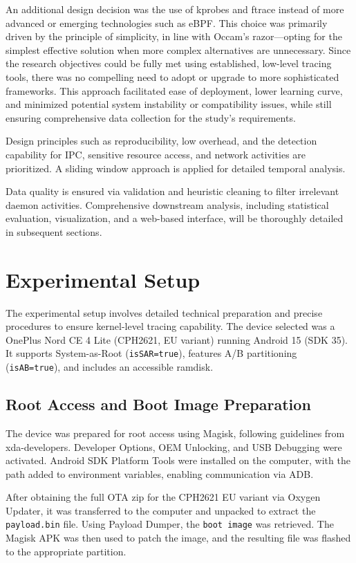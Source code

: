 \documentclass[a4paper,12pt]{report}
\begin{document}
An additional design decision was the use of kprobes and ftrace instead of more advanced or emerging technologies such as eBPF. This choice was primarily driven by the principle of simplicity, in line with Occam's razor—opting for the simplest effective solution when more complex alternatives are unnecessary. Since the research objectives could be fully met using established, low-level tracing tools, there was no compelling need to adopt or upgrade to more sophisticated frameworks. This approach facilitated ease of deployment, lower learning curve, and minimized potential system instability or compatibility issues, while still ensuring comprehensive data collection for the study's requirements.

Design principles such as reproducibility, low overhead, and the detection capability for IPC, sensitive resource access, and network activities are prioritized. A sliding window approach is applied for detailed temporal analysis.

Data quality is ensured via validation and heuristic cleaning to filter irrelevant daemon activities. Comprehensive downstream analysis, including statistical evaluation, visualization, and a web-based interface, will be thoroughly detailed in subsequent sections.
\section{Experimental Setup}

The experimental setup involves detailed technical preparation and precise procedures to ensure kernel-level tracing capability. The device selected was a OnePlus Nord CE 4 Lite (CPH2621, EU variant) running Android 15 (SDK 35). It supports System-as-Root (\texttt{isSAR=true}), features A/B partitioning (\texttt{isAB=true}), and includes an accessible ramdisk.

\subsection{Root Access and Boot Image Preparation}

The device was prepared for root access using Magisk, following guidelines from xda-developers. Developer Options, OEM Unlocking, and USB Debugging were activated. Android SDK Platform Tools were installed on the computer, with the path added to environment variables, enabling communication via ADB.

After obtaining the full OTA zip for the CPH2621 EU variant via Oxygen Updater, it was transferred to the computer and unpacked to extract the \texttt{payload.bin} file. Using Payload Dumper, the \texttt{boot image} was retrieved. The Magisk APK was then used to patch the image, and the resulting file was flashed to the appropriate partition.
\end{document}
